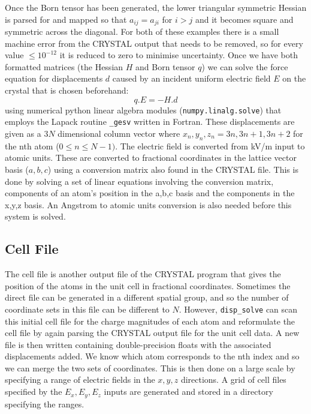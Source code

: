 \documentclass[10pt]{article}
\begin{document}
Once the Born tensor has been generated, the lower triangular symmetric Hessian is parsed for and mapped so that $a_{ij} = a_{ji}$ for $i > j$ and it becomes square and symmetric across the diagonal. For both of these examples there is a small machine error from the CRYSTAL output that needs to be removed, so for every value $\leq 10^{-12}$ it is reduced to zero to minimise uncertainty. Once we have both formatted matrices (the Hessian $H$ and Born tensor $q$) we can solve the force equation for displacements $d$ caused by an incident uniform electric field $E$ on the crystal that is chosen beforehand:
\begin{equation*}
q.E = -H.d
\end{equation*}
using numerical python linear algebra modules (\texttt{numpy.linalg.solve}) that employs the Lapack routine \texttt{\_gesv} written in Fortran. These displacements are given as a $3N$ dimensional column vector where $x_n,y_n,z_n = 3n, 3n+1, 3n+2$ for the nth atom ($0\leq n \leq N-1)$. The electric field is converted from kV/m input to atomic units. These are converted to fractional coordinates in the lattice vector basis ($a,b,c$) using a conversion matrix also found in the CRYSTAL file. This is done by solving a set of linear equations involving the conversion matrix, components of an atom's position in the a,b,c basis and the components in the x,y,z basis. An Angstrom to atomic units conversion is also needed before this system is solved.

\subsection{Cell File}
The cell file is another output file of the CRYSTAL program that gives the position of the atoms in the unit cell in fractional coordinates. Sometimes the direct file can be generated in a different spatial group, and so the number of coordinate sets in this file can be different to $N$. However, \texttt{disp\_solve} can scan this initial cell file for the charge magnitudes of each atom and reformulate the cell file by again parsing the CRYSTAL output file for the unit cell data. A new file is then written containing double-precision floats with the associated displacements added. We know which atom corresponds to the nth index and so we can merge the two sets of coordinates. This is then done on a large scale by specifying a range of electric fields in the $x,y,z$ directions. A grid of cell files specified by the $E_x,E_y,E_z$ inputs are generated and stored in a directory specifying the ranges. 


\end{document}
